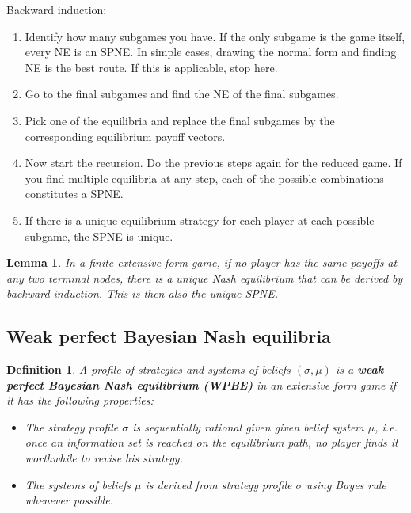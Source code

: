 \documentclass[10pt]{article}
\theoremstyle{basic}
\newtheorem{definition}{Definition}[section]
\newtheorem{lemma}[theorem]{Lemma}
\begin{document}
\begin{spacing}{1.0}
Backward induction:

\begin{enumerate}
\item Identify how many subgames you have. If the only subgame is the game
  itself, every NE is an SPNE. In simple cases, drawing the normal form and
  finding NE is the best route. If this is applicable, stop here.
\item Go to the final subgames and find the NE of the final subgames.
\item Pick one of the equilibria and replace the final subgames by the
  corresponding equilibrium payoff vectors.
\item Now start the recursion. Do the previous steps again for the reduced
  game. If you find multiple equilibria at any step, each of the possible
  combinations constitutes a SPNE.
\item If there is a unique equilibrium strategy for each player at each
  possible subgame, the SPNE is unique.
\end{enumerate}

\begin{lemma}
  In a finite extensive form game, if no player has the same payoffs at any
  two terminal nodes, there is a unique Nash equilibrium that can be
  derived by backward induction. This is then also the unique SPNE.
\end{lemma}

\subsection{Weak perfect Bayesian Nash equilibria}

\begin{definition}
  A profile of strategies and systems of beliefs $(\sigma, \mu)$ is a
  \textbf{weak perfect Bayesian Nash equilibrium (WPBE)} in an extensive
  form game if it has the following properties:
  \begin{itemize}
  \item The strategy profile $\sigma$ is sequentially rational given given
    belief system $\mu$, i.e. once an information set is reached on the
    equilibrium path, no player finds it worthwhile to revise his strategy.
  \item The systems of beliefs $\mu$ is derived from strategy profile
    $\sigma$ using Bayes rule whenever possible.
  \end{itemize}
\end{definition}


\end{spacing}
\end{document}
